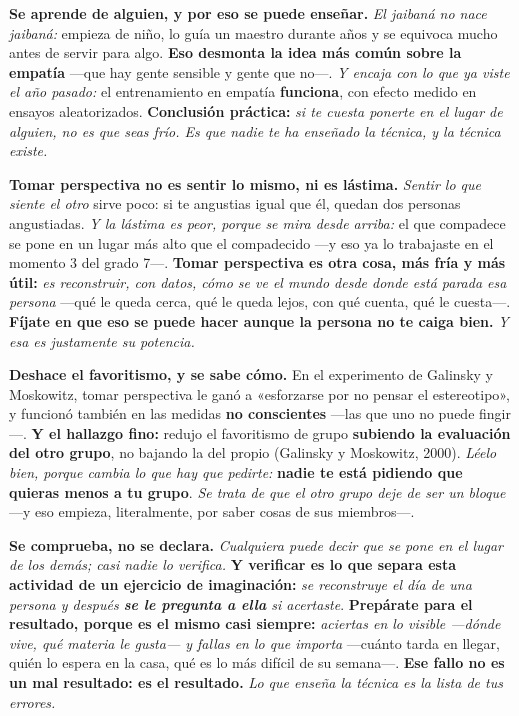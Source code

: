 \documentclass[11pt,letterpaper]{article}
\newcommand{\milcpaso}[3]{%
\Needspace{4\baselineskip}%
\begin{tcolorbox}[enhanced,colback=white,colframe=milcLinea,arc=1.5mm,boxrule=.9pt,
  left=14mm,right=4mm,top=3mm,bottom=3mm,before skip=4pt,after skip=4pt,
  fontupper=\RaggedRight,
  overlay={\node[anchor=north west,circle,fill=#2,text=white,inner sep=0pt,
    minimum size=7.4mm,font=\sffamily\bfseries\small]
    at ([xshift=3.6mm,yshift=-3.2mm]frame.north west) {#1};}]
#3
\end{tcolorbox}}
\begin{document}
\milcpaso{1}{milcTurquesa}{\textbf{Se aprende de alguien, y por eso se puede enseñar.} \emph{El jaibaná no nace jaibaná:} empieza de niño, lo guía un maestro durante años y se equivoca mucho antes de servir para algo. \textbf{Eso desmonta la idea más común sobre la empatía} ---que hay gente sensible y gente que no---. \emph{Y encaja con lo que ya viste el año pasado:} el entrenamiento en empatía \textbf{funciona}, con efecto medido en ensayos aleatorizados. \textbf{Conclusión práctica:} \emph{si te cuesta ponerte en el lugar de alguien, no es que seas frío. Es que nadie te ha enseñado la técnica, y la técnica existe.}}
\milcpaso{2}{milcTurquesa}{\textbf{Tomar perspectiva no es sentir lo mismo, ni es lástima.} \emph{Sentir lo que siente el otro} sirve poco: si te angustias igual que él, quedan dos personas angustiadas. \emph{Y la lástima es peor, porque se mira desde arriba:} el que compadece se pone en un lugar más alto que el compadecido ---y eso ya lo trabajaste en el momento 3 del grado 7---. \textbf{Tomar perspectiva es otra cosa, más fría y más útil:} \emph{es reconstruir, con datos, cómo se ve el mundo desde donde está parada esa persona} ---qué le queda cerca, qué le queda lejos, con qué cuenta, qué le cuesta---. \textbf{Fíjate en que eso se puede hacer aunque la persona no te caiga bien.} \emph{Y esa es justamente su potencia.}}
\milcpaso{3}{milcTurquesa}{\textbf{Deshace el favoritismo, y se sabe cómo.} En el experimento de Galinsky y Moskowitz, tomar perspectiva le ganó a «esforzarse por no pensar el estereotipo», y funcionó también en las medidas \textbf{no conscientes} ---las que uno no puede fingir---. \textbf{Y el hallazgo fino:} redujo el favoritismo de grupo \textbf{subiendo la evaluación del otro grupo}, no bajando la del propio (Galinsky y Moskowitz, 2000). \emph{Léelo bien, porque cambia lo que hay que pedirte:} \textbf{nadie te está pidiendo que quieras menos a tu grupo}. \emph{Se trata de que el otro grupo deje de ser un bloque} ---y eso empieza, literalmente, por saber cosas de sus miembros---.}
\milcpaso{4}{milcTurquesa}{\textbf{Se comprueba, no se declara.} \emph{Cualquiera puede decir que se pone en el lugar de los demás; casi nadie lo verifica.} \textbf{Y verificar es lo que separa esta actividad de un ejercicio de imaginación:} \emph{se reconstruye el día de una persona y después \textbf{se le pregunta a ella} si acertaste}. \textbf{Prepárate para el resultado, porque es el mismo casi siempre:} \emph{aciertas en lo visible ---dónde vive, qué materia le gusta--- y fallas en lo que importa} ---cuánto tarda en llegar, quién lo espera en la casa, qué es lo más difícil de su semana---. \textbf{Ese fallo no es un mal resultado: es el resultado.} \emph{Lo que enseña la técnica es la lista de tus errores.}}
\end{document}
